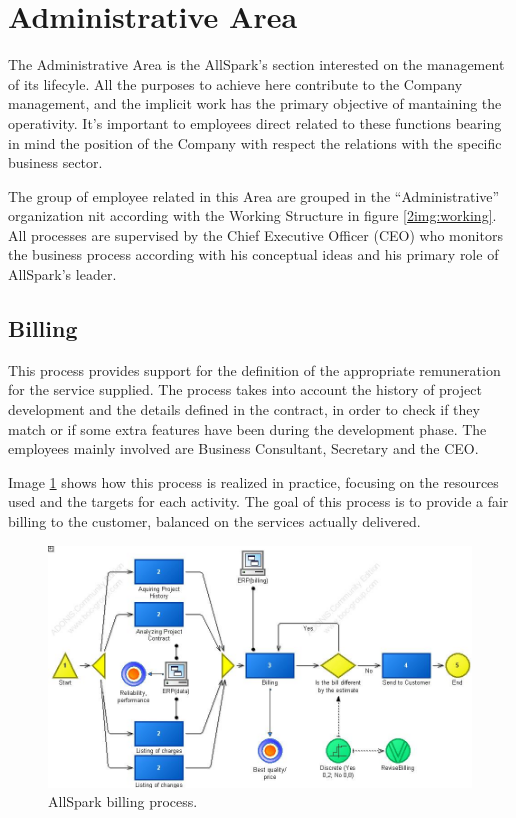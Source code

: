 \section{Administrative Area}
The Administrative Area is the AllSpark's section interested on the management of its lifecyle. All the purposes to achieve here contribute to the Company management, and the implicit work has the primary objective of mantaining the operativity. It's important to employees direct related to these functions bearing in mind the position of the Company with respect the relations with the specific business sector.

The group of employee related in this Area are grouped in the ``Administrative'' organization nit according with the Working Structure in figure \ref{2img:working}. All processes are supervised by the Chief Executive Officer (CEO) who monitors the business process according with his conceptual ideas and his primary role of AllSpark's leader.

\subsection{Billing}
This process provides support for the definition of the appropriate remuneration for the service supplied.
The process takes into account the history of project development and the details defined in the contract, in order to check if they match or if some extra features have been during the development phase. The employees mainly involved are Business Consultant, Secretary and the CEO.

Image \ref{2img:billing} shows how this process is realized in practice, focusing on the resources used and the targets for each activity. The goal of this process is to provide a fair billing to the customer, balanced on the services actually delivered.\\

\begin{figure}[ht!]
\begin{centering}
\includegraphics[scale=0.50, angle=90]{assign2/adonis/imgs/billing.jpg}
\caption{AllSpark billing process.}
\label{2img:billing}
\end{centering}
\end{figure}


